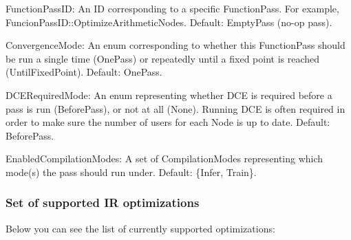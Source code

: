 \begin{DoxyItemize}
\item {\ttfamily Function\+Pass\+ID}\+: An ID corresponding to a specific Function\+Pass. For example, {\ttfamily Funcion\+Pass\+I\+D\+::\+Optimize\+Arithmetic\+Nodes}. Default\+: {\ttfamily Empty\+Pass} (no-\/op pass).
\item {\ttfamily Convergence\+Mode}\+: An enum corresponding to whether this Function\+Pass should be run a single time (One\+Pass) or repeatedly until a fixed point is reached ({\ttfamily Until\+Fixed\+Point}). Default\+: {\ttfamily One\+Pass}.
\item {\ttfamily D\+C\+E\+Required\+Mode}\+: An enum representing whether D\+CE is required before a pass is run ({\ttfamily Before\+Pass}), or not at all ({\ttfamily None}). Running D\+CE is often required in order to make sure the number of users for each Node is up to date. Default\+: {\ttfamily Before\+Pass}.
\item {\ttfamily Enabled\+Compilation\+Modes}\+: A set of {\ttfamily Compilation\+Mode}s representing which mode(s) the pass should run under. Default\+: {\ttfamily \{Infer, Train\}}.
\end{DoxyItemize}

\subsubsection*{Set of supported IR optimizations}

Below you can see the list of currently supported optimizations\+:


